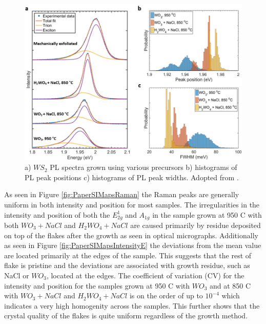 \begin{figure}[h]
	\begin{center}
		\includegraphics[scale=0.3]{PaperPLSpectraHistograms.png}
		\caption{a) $WS_2$ PL spectra grown using various precursors b) histograms of PL peak positions c) histograms of PL peak widths. Adopted from \cite{Reale2017}.}
		\label{fig:PaperPLSpectraHistograms}
	\end{center}
\end{figure}

As seen in Figure \ref{fig:PaperSIMapsRaman} the Raman peaks are generally uniform in both intensity and position for most samples. The irregularities in the intensity and position of both the $E^1_{2g}$ and $A_{1g}$ in the sample grown at 950 {\degree}C with both $WO_3 + NaCl$ and $H_2WO_4 + NaCl$ are caused primarily by residue deposited on top of the flakes after the growth as seen in optical micrographs. Additionally as seen in Figure \ref{fig:PaperSIMapsIntensityE} the deviations from the mean value are located primarily at the edges of the sample. This suggests that the rest of flake is pristine and the deviations are associated with growth residue, such as NaCl or $WO_3$, located at the edges. The coefficient of variation (CV) for the intensity and position for the samples grown at 950 {\degree}C with $WO_3$ and at 850 {\degree}C with $WO_3 + NaCl$ and $H_2WO_4 + NaCl$ is on the order of up to $10^{-4}$ which indicates a very high homogenity across the samples. This further shows that the crystal quality of the flakes is quite uniform regardless of the growth method.

